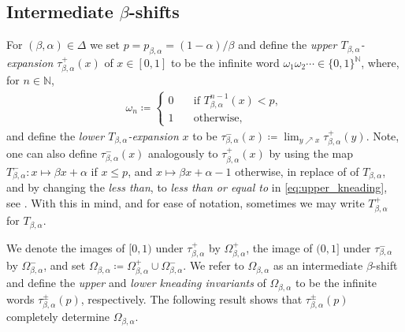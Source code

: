 \documentclass[a4paper,reqno,10pt]{amsart}
\begin{document}
%
%
%
\subsection{Intermediate \texorpdfstring{$\beta$}{beta}-shifts}\label{sec:beta-shifts}
%
%
%

For $(\beta, \alpha) \in \Delta$ we set $p = p_{\beta, \alpha} = (1-\alpha)/\beta$ and define the \textsl{upper $T_{\beta, \alpha}$-expansion} $\tau_{\beta, \alpha}^{+}(x)$ of $x \in [0, 1]$ to be the infinite word $\omega_{1} \omega_{2} \cdots  \in \{ 0, 1\}^{\mathbb{N}}$, where, for $n \in \mathbb{N}$,
    \begin{align}\label{eq:upper_kneading}
        \omega_{n} \coloneqq
            \begin{cases}
                0 & \quad \text{if } T_{\beta,\alpha}^{n-1}(x) < p,\\
                1 & \quad \text{otherwise,}
            \end{cases}
    \end{align}
and define the \textsl{lower $T_{\beta, \alpha}$-expansion} $x$ to be $\tau^{-}_{\beta, \alpha}(x) \coloneqq \lim_{y \nearrow x} \tau_{\beta,\alpha}^{+}(y)$. Note, one can also define $\tau^{-}_{\beta, \alpha}(x)$ analogously to $\tau^{+}_{\beta, \alpha}(x)$ by using the map $T_{\beta,\alpha}^{-} \colon x \mapsto \beta x + \alpha$ if $x \leq p$, and $x \mapsto \beta x + \alpha - 1$ otherwise, in replace of of $T_{\beta, \alpha}$, and by changing the \textsl{less than}, to \textsl{less than or equal to} in \eqref{eq:upper_kneading}, see \cite[Section 2.2]{LSSS}.  With this in mind, and for ease of notation, sometimes we may write $T_{\beta,\alpha}^{+}$ for $T_{\beta, \alpha}$.

We denote the images of $[0,1)$ under $\tau_{\beta, \alpha}^{+}$ by $\Omega^{+}_{\beta, \alpha}$, the image of $(0,1]$ under $\tau_{\beta, \alpha}^{-}$ by $\Omega^{-}_{\beta, \alpha}$, and set $\Omega_{\beta, \alpha} \coloneqq \Omega_{\beta, \alpha}^{+} \cup \Omega_{\beta, \alpha}^{-}$.  We refer to $\Omega_{\beta, \alpha}$ as an intermediate $\beta$-shift and define the \textsl{upper} and \textsl{lower kneading invariants} of $\Omega_{\beta,\alpha}$ to be the infinite words $\tau^{\pm}_{\beta, \alpha}(p)$, respectively. The following result shows that $\tau^{\pm}_{\beta, \alpha}(p)$ completely determine $\Omega_{\beta,\alpha}$.
\end{document}
